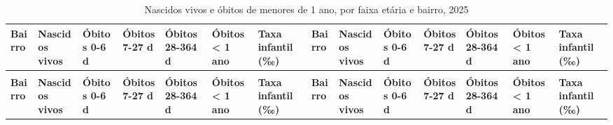 \begin{apendicesenv}
\begin{landscape}
{\renewcommand{\arraystretch}{1.0}
{\scriptsize\setlength{\tabcolsep}{3.5pt}
\begin{longtable}{@{}>{\raggedright\arraybackslash}p{2.65cm}>{\raggedleft\arraybackslash}p{1.26cm}>{\raggedleft\arraybackslash}p{1.26cm}>{\raggedleft\arraybackslash}p{1.26cm}>{\raggedleft\arraybackslash}p{1.26cm}>{\raggedleft\arraybackslash}p{1.26cm}>{\raggedleft\arraybackslash}p{1.26cm}@{\hspace{0.6cm}}>{\raggedright\arraybackslash}p{2.65cm}>{\raggedleft\arraybackslash}p{1.26cm}>{\raggedleft\arraybackslash}p{1.26cm}>{\raggedleft\arraybackslash}p{1.26cm}>{\raggedleft\arraybackslash}p{1.26cm}>{\raggedleft\arraybackslash}p{1.26cm}>{\raggedleft\arraybackslash}p{1.26cm}@{}}
\caption{Nascidos vivos e óbitos de menores de 1 ano, por faixa etária e bairro, 2025}\label{tab:tabela-mapa-mortalidade-infantil-2025}\\
\toprule \hyphenpenalty=10000\exhyphenpenalty=10000\textbf{Bairro} & \hyphenpenalty=10000\exhyphenpenalty=10000\textbf{Nascidos vivos} & \hyphenpenalty=10000\exhyphenpenalty=10000\textbf{Óbitos 0-6 d} & \hyphenpenalty=10000\exhyphenpenalty=10000\textbf{Óbitos 7-27 d} & \hyphenpenalty=10000\exhyphenpenalty=10000\textbf{Óbitos 28-364 d} & \hyphenpenalty=10000\exhyphenpenalty=10000\textbf{Óbitos < 1 ano} & \hyphenpenalty=10000\exhyphenpenalty=10000\textbf{Taxa infantil (‰)} & \hyphenpenalty=10000\exhyphenpenalty=10000\textbf{Bairro} & \hyphenpenalty=10000\exhyphenpenalty=10000\textbf{Nascidos vivos} & \hyphenpenalty=10000\exhyphenpenalty=10000\textbf{Óbitos 0-6 d} & \hyphenpenalty=10000\exhyphenpenalty=10000\textbf{Óbitos 7-27 d} & \hyphenpenalty=10000\exhyphenpenalty=10000\textbf{Óbitos 28-364 d} & \hyphenpenalty=10000\exhyphenpenalty=10000\textbf{Óbitos < 1 ano} & \hyphenpenalty=10000\exhyphenpenalty=10000\textbf{Taxa infantil (‰)} \\ \midrule \endfirsthead
\multicolumn{14}{@{}l}{\footnotesize\itshape (continuação)}\\ \toprule \hyphenpenalty=10000\exhyphenpenalty=10000\textbf{Bairro} & \hyphenpenalty=10000\exhyphenpenalty=10000\textbf{Nascidos vivos} & \hyphenpenalty=10000\exhyphenpenalty=10000\textbf{Óbitos 0-6 d} & \hyphenpenalty=10000\exhyphenpenalty=10000\textbf{Óbitos 7-27 d} & \hyphenpenalty=10000\exhyphenpenalty=10000\textbf{Óbitos 28-364 d} & \hyphenpenalty=10000\exhyphenpenalty=10000\textbf{Óbitos < 1 ano} & \hyphenpenalty=10000\exhyphenpenalty=10000\textbf{Taxa infantil (‰)} & \hyphenpenalty=10000\exhyphenpenalty=10000\textbf{Bairro} & \hyphenpenalty=10000\exhyphenpenalty=10000\textbf{Nascidos vivos} & \hyphenpenalty=10000\exhyphenpenalty=10000\textbf{Óbitos 0-6 d} & \hyphenpenalty=10000\exhyphenpenalty=10000\textbf{Óbitos 7-27 d} & \hyphenpenalty=10000\exhyphenpenalty=10000\textbf{Óbitos 28-364 d} & \hyphenpenalty=10000\exhyphenpenalty=10000\textbf{Óbitos < 1 ano} & \hyphenpenalty=10000\exhyphenpenalty=10000\textbf{Taxa infantil (‰)} \\ \midrule \endhead

\end{longtable}}}
\end{landscape}
\end{apendicesenv}
